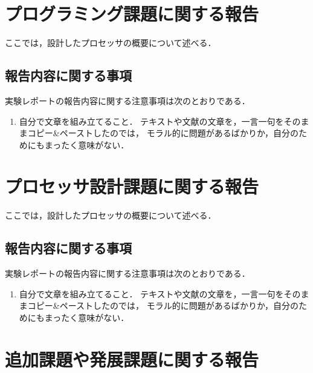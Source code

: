 \documentclass{jarticle}[11pt]
\begin{document}
\newpage



\section{プログラミング課題に関する報告}
\label{sec:プログラミング課題に関する報告}

ここでは，設計したプロセッサの概要について述べる．

\subsection{報告内容に関する事項}
実験レポートの報告内容に関する注意事項は次のとおりである．
\begin{enumerate}
\item 自分で文章を組み立てること．
テキストや文献の文章を，一言一句をそのままコピー\&ペーストしたのでは，
モラル的に問題があるばかりか，自分のためにもまったく意味がない．
\end{enumerate}





\section{プロセッサ設計課題に関する報告}
\label{sec:プロセッサ設計課題に関する報告}

ここでは，設計したプロセッサの概要について述べる．

\subsection{報告内容に関する事項}
実験レポートの報告内容に関する注意事項は次のとおりである．
\begin{enumerate}
\item 自分で文章を組み立てること．
テキストや文献の文章を，一言一句をそのままコピー\&ペーストしたのでは，
モラル的に問題があるばかりか，自分のためにもまったく意味がない．
\end{enumerate}





\section{追加課題や発展課題に関する報告}
\label{sec:追加課題や発展課題に関する報告}
\end{document}
